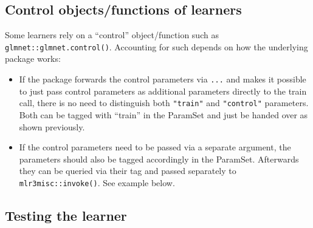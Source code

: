 \documentclass[
]{scrbook}
\newenvironment{Shaded}{\begin{snugshade}}{\end{snugshade}}
\newcommand{\AttributeTok}[1]{\textcolor[rgb]{0.77,0.63,0.00}{#1}}
\newcommand{\ControlFlowTok}[1]{\textcolor[rgb]{0.13,0.29,0.53}{\textbf{#1}}}
\newcommand{\ErrorTok}[1]{\textcolor[rgb]{0.64,0.00,0.00}{\textbf{#1}}}
\newcommand{\FunctionTok}[1]{\textcolor[rgb]{0.00,0.00,0.00}{#1}}
\newcommand{\NormalTok}[1]{#1}
\newcommand{\OtherTok}[1]{\textcolor[rgb]{0.56,0.35,0.01}{#1}}
\newcommand{\SpecialCharTok}[1]{\textcolor[rgb]{0.00,0.00,0.00}{#1}}
\newcommand{\StringTok}[1]{\textcolor[rgb]{0.31,0.60,0.02}{#1}}
\providecommand{\tightlist}{%
  \setlength{\itemsep}{0pt}\setlength{\parskip}{0pt}}
\renewenvironment{Shaded} {\begin{snugshade}\small} {\end{snugshade}}
\begin{document}
\hypertarget{learner-control}{%
\subsection{Control objects/functions of learners}\label{learner-control}}

Some learners rely on a ``control'' object/function such as \texttt{glmnet::glmnet.control()}.
Accounting for such depends on how the underlying package works:

\begin{itemize}
\tightlist
\item
  If the package forwards the control parameters via \texttt{...} and makes it possible to just pass control parameters as additional parameters directly to the train call, there is no need to distinguish both \texttt{"train"} and \texttt{"control"} parameters.
  Both can be tagged with ``train'' in the ParamSet and just be handed over as shown previously.
\item
  If the control parameters need to be passed via a separate argument, the parameters should also be tagged accordingly in the ParamSet.
  Afterwards they can be queried via their tag and passed separately to \texttt{mlr3misc::invoke()}.
  See example below.
\end{itemize}

\begin{Shaded}
\end{Shaded}

\hypertarget{learner-test}{%
\subsection{Testing the learner}\label{learner-test}}
\end{document}
